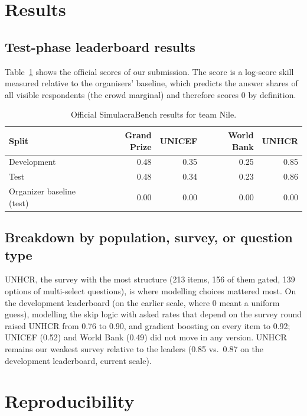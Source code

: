 \documentclass{article}
\newcommand{\teamid}{Nile}
\begin{document}
\section{Results}
\label{sec:results}

\subsection{Test-phase leaderboard results}
Table~\ref{tab:results} shows the official scores of our submission. The score is a log-score
skill measured relative to the organisers' baseline, which predicts the answer shares of all
visible respondents (the crowd marginal) and therefore scores 0 by definition.

\begin{table}[h]
  \centering
  \small
  \caption{Official SimulacraBench results for team \teamid{}.}
  \label{tab:results}
  \begin{tabular}{lrrrr}
    \toprule
    Split & Grand Prize & UNICEF & World Bank & UNHCR \\
    \midrule
    Development & 0.48 & 0.35 & 0.25 & 0.85 \\
    Test        & 0.48 & 0.34 & 0.23 & 0.86 \\
    Organizer baseline (test) & 0.00 & 0.00 & 0.00 & 0.00 \\
    \bottomrule
  \end{tabular}
\end{table}

\subsection{Breakdown by population, survey, or question type}
UNHCR, the survey with the most structure (213 items, 156 of them gated, 139 options of
multi-select questions), is where modelling choices mattered most. On the development leaderboard
(on the earlier scale, where 0 meant a uniform guess), modelling the skip logic with asked rates
that depend on the survey round raised UNHCR from 0.76 to 0.90, and gradient boosting on every item to 0.92; UNICEF (0.52) and World
Bank (0.49) did not move in any version. UNHCR remains our weakest survey relative to the
leaders (0.85 vs.\ 0.87 on the development leaderboard, current scale).

\section{Reproducibility}
\label{sec:repro}
\end{document}
